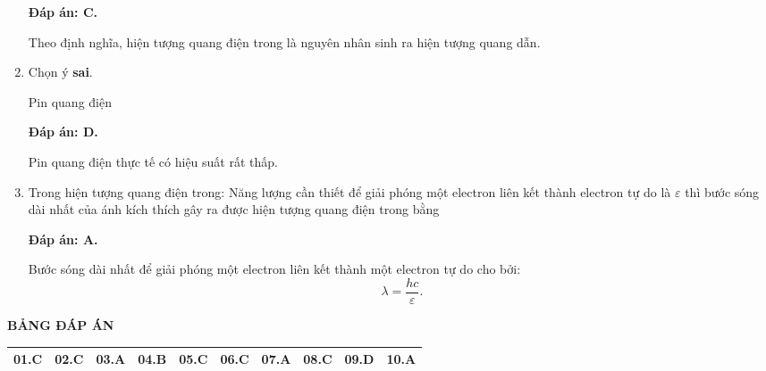 \begin{enumerate}[label=\bfseries Câu \arabic*:]
	\loigiai
	{		\textbf{Đáp án: C.}
		
Theo định nghĩa, hiện tượng quang điện trong là nguyên nhân sinh ra hiện tượng quang dẫn. 
		
	}
	
	\item {} 
	
	\cauhoi
	{Chọn ý \textbf{sai}. 
	
	Pin quang điện
	}
	
	\loigiai
	{		\textbf{Đáp án: D.}
		
Pin quang điện thực tế có hiệu suất rất thấp. 
		
	}
	
	\item {} 
	
	\cauhoi
	{Trong hiện tượng quang điện trong: Năng lượng cần thiết để giải phóng một electron liên kết thành electron tự do là $\varepsilon$ thì bước sóng dài nhất của ánh kích thích gây ra được hiện tượng quang điện trong bằng
	}
	
	\loigiai
	{		\textbf{Đáp án: A.}
		
Bước sóng dài nhất để giải phóng một electron liên kết thành một electron tự do cho bởi:
$$
	\lambda = \dfrac{hc}{\varepsilon}.
$$
		
	}
	
\end{enumerate}

\loigiai
{
	\begin{center}
		\textbf{BẢNG ĐÁP ÁN}
	\end{center}
	\begin{center}
		\begin{tabular}{|m{2.8em}|m{2.8em}|m{2.8em}|m{2.8em}|m{2.8em}|m{2.8em}|m{2.8em}|m{2.8em}|m{2.8em}|m{2.8em}|}
			\hline
			01.C  & 02.C  & 03.A  & 04.B  & 05.C  & 06.C  & 07.A & 08.C & 09.D & 10.A \\
			\hline
			
		\end{tabular}
	\end{center}
}

